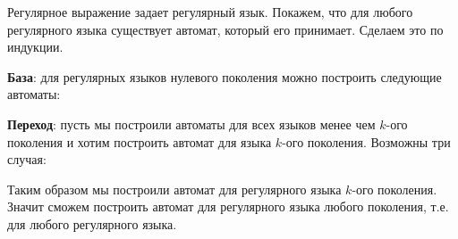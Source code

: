 \label{thompson-construction}

Регулярное выражение задает регулярный язык. Покажем, что для любого регулярного
языка существует автомат, который его принимает. Сделаем это по индукции.

\textbf{База}: для регулярных языков нулевого поколения можно построить
следующие автоматы:



\textbf{Переход}: пусть мы построили автоматы для всех языков менее чем
\(k\)-ого поколения и хотим построить автомат для языка \(k\)-ого поколения.
Возможны три случая:



Таким образом мы построили автомат для регулярного языка \(k\)-ого поколения.
Значит сможем построить автомат для регулярного языка любого поколения, т.е. для
любого регулярного языка.

